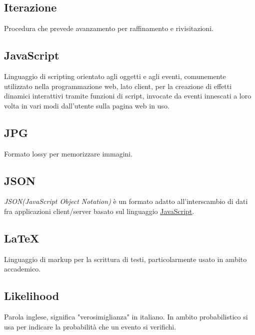 	\subsection{Iterazione}
	\label{sec:iterazione}
	Procedura che prevede avanzamento per raffinamento e rivisitazioni.


	\newpage

	\subsection{JavaScript}
	\label{sec:javascript}
	Linguaggio di scripting orientato agli oggetti e agli eventi, comunemente utilizzato nella programmazione web, lato client, per la creazione di effetti dinamici interattivi tramite funzioni di script, invocate da eventi innescati a loro volta in vari modi dall'utente sulla pagina web in uso.

	\subsection{JPG}
	\label{sec:jpg}
	Formato lossy per memorizzare immagini.
	

	\subsection{JSON}
	\label{sec:json}
	\emph{JSON(JavaScript Object Notation)} è un formato adatto all'interscambio di dati fra applicazioni client/server basato sul linguaggio \underline{\hyperref[sec:javascript]{JavaScript}}.
	

	\newpage

	
	\subsection{LaTeX}
	\label{sec:latex}
	Linguaggio di markup per la scrittura di testi, particolarmente usato in ambito accademico.


	
	\subsection{Likelihood}
	\label{sec:likelihood}
	Parola inglese, significa "verosimiglianza" in italiano. In ambito probabilistico si usa per indicare la probabilità che un evento si verifichi.

